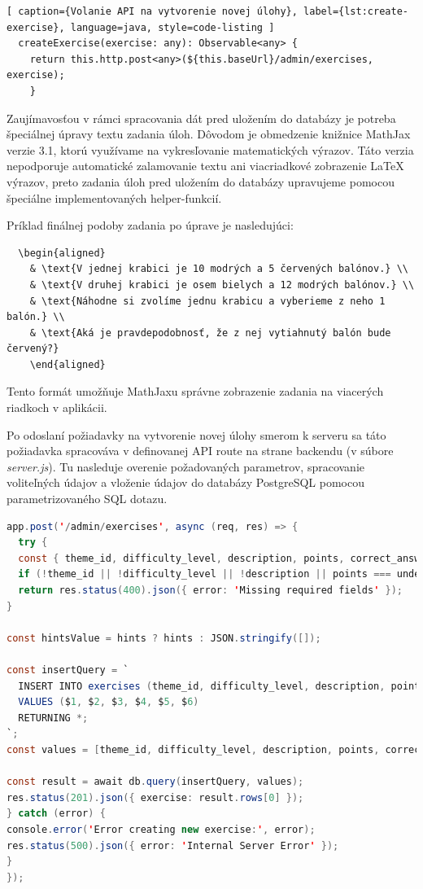 \begin{lstlisting}[ caption={Volanie API na vytvorenie novej úlohy}, label={lst:create-exercise}, language=java, style=code-listing ] 
  createExercise(exercise: any): Observable<any> { 
    return this.http.post<any>(${this.baseUrl}/admin/exercises, exercise); 
    } 
  \end{lstlisting}

Zaujímavosťou v rámci spracovania dát pred uložením do databázy je potreba špeciálnej úpravy textu zadania úloh. 
Dôvodom je obmedzenie knižnice MathJax verzie 3.1, ktorú využívame na vykresľovanie matematických výrazov. 
Táto verzia nepodporuje automatické zalamovanie textu ani viacriadkové zobrazenie LaTeX výrazov, preto zadania úloh pred uložením do databázy upravujeme pomocou špeciálne implementovaných helper-funkcií.

Príklad finálnej podoby zadania po úprave je nasledujúci:
\begin{verbatim}
  \begin{aligned}
    & \text{V jednej krabici je 10 modrých a 5 červených balónov.} \\
    & \text{V druhej krabici je osem bielych a 12 modrých balónov.} \\
    & \text{Náhodne si zvolíme jednu krabicu a vyberieme z neho 1 balón.} \\
    & \text{Aká je pravdepodobnosť, že z nej vytiahnutý balón bude červený?}
    \end{aligned}
\end{verbatim}
Tento formát umožňuje MathJaxu správne zobrazenie zadania na viacerých riadkoch v aplikácii.

Po odoslaní požiadavky na vytvorenie novej úlohy smerom k serveru sa táto požiadavka spracováva v definovanej API route na strane backendu (v súbore \textit{server.js}). 
Tu nasleduje overenie požadovaných parametrov, spracovanie voliteľných údajov a vloženie údajov do databázy PostgreSQL pomocou parametrizovaného SQL dotazu.
\begin{lstlisting}[caption={Serverová logika na spracovanie POST požiadavky pre vytvorenie úlohy}, label={create_exercise}, language=java, style=code-listing]
  app.post('/admin/exercises', async (req, res) => {
  try {
  const { theme_id, difficulty_level, description, points, correct_answer, hints } = req.body;
  if (!theme_id || !difficulty_level || !description || points === undefined || !correct_answer) {
  return res.status(400).json({ error: 'Missing required fields' });
}

const hintsValue = hints ? hints : JSON.stringify([]);

const insertQuery = `
  INSERT INTO exercises (theme_id, difficulty_level, description, points, correct_answer, hints)
  VALUES ($1, $2, $3, $4, $5, $6)
  RETURNING *;
`;
const values = [theme_id, difficulty_level, description, points, correct_answer, hintsValue];

const result = await db.query(insertQuery, values);
res.status(201).json({ exercise: result.rows[0] });
} catch (error) {
console.error('Error creating new exercise:', error);
res.status(500).json({ error: 'Internal Server Error' });
}
});
\end{lstlisting}


